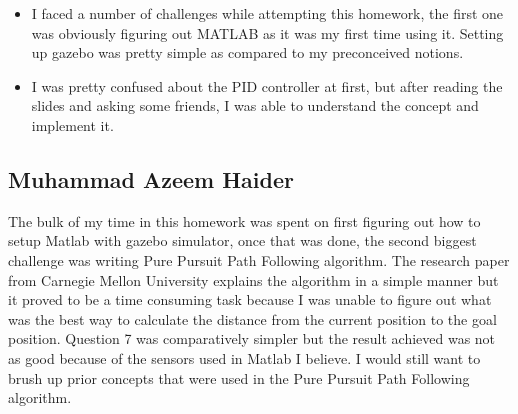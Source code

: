 \documentclass[answers]{exam}
\begin{document}
\begin{questions}
\begin{parts}
\begin{solution}
            \begin{itemize}
                \item I faced a number of challenges while attempting this homework, the first one
                      was obviously figuring out MATLAB as it was my first time using it. Setting up
                      gazebo was pretty simple as compared to my preconceived notions.
                \item I was pretty confused about the PID controller at first, but after reading the
                      slides and asking some friends, I was able to understand the concept and
                      implement it.
            \end{itemize}
            \subsection*{Muhammad Azeem Haider}
            The bulk of my time in this homework was spent on first figuring out how to
            setup Matlab with gazebo simulator, once that was done, the second biggest
            challenge was writing Pure Pursuit Path Following algorithm. The research paper
            from Carnegie Mellon University explains the algorithm in a simple manner but
            it proved to be a time consuming task because I was unable to figure out what
            was the best way to calculate the distance from the current position to the
            goal position. Question 7 was comparatively simpler but the result achieved was
            not as good because of the sensors used in Matlab I believe. I would still want
            to brush up prior concepts that were used in the Pure Pursuit Path Following
            algorithm.
        \end{solution}
    \end{parts}

\end{questions}
\end{document}
